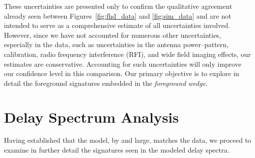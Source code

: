 \documentclass[preprint2,iop,numberedappendix]{emulateapj}
\begin{document}
\begin{figure}[htb]
\end{figure}

These uncertainties are presented only to confirm the qualitative agreement already seen between Figures~\ref{fig:fhd_data} and \ref{fig:sim_data} and are not intended to serve as a comprehensive estimate of all uncertainties involved. However, since we have not accounted for numerous other uncertainties, especially in the data, such as uncertainties in the antenna power--pattern, calibration, radio frequency interference (RFI), and wide field imaging effects, our estimates are conservative. Accounting for such uncertainties will only improve our confidence level in this comparison. Our primary objective is to explore in detail the foreground signatures embedded in the {\it foreground wedge}.

\section{Delay Spectrum Analysis}\label{sec:delay-spectrum-analysis}

Having established that the model, by and large, matches the data, we proceed to examine in further detail the signatures seen in the modeled delay spectra. 
\end{document}
